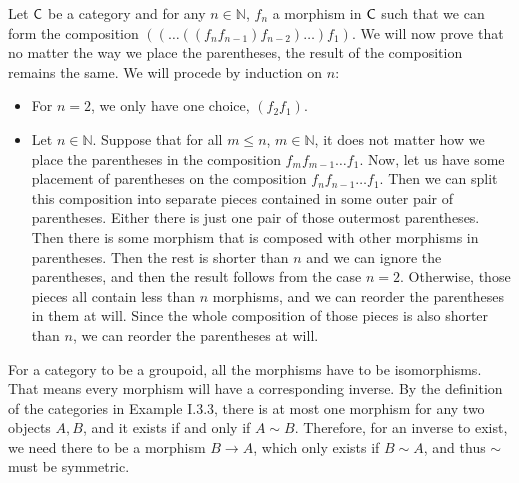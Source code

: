 \begin{solution}
	Let $\mathsf{C}$ be a category and for any $n \in \mathbb{N}$, $f_n$ a morphism in $\mathsf{C}$ such that we can form the composition $((\dots((f_{n}f_{n-1})f_{n-2})\dots)f_1)$. We will now prove that no matter the way we place the parentheses, the result of the composition remains the same. We will procede by induction on $n$:
	\begin{itemize}
		\item For $n=2$, we only have one choice, $(f_2f_1)$.
		\item Let $n \in \mathbb{N}$. Suppose that for all $m \leq n$, $m \in \mathbb{N}$, it does not matter how we place the parentheses in the composition $f_mf_{m-1}\dots f_1$. Now, let us have some placement of parentheses on the composition $f_nf_{n-1}\dots f_1$. Then we can split this composition into separate pieces contained in some outer pair of parentheses. Either there is just one pair of those outermost parentheses. Then there is some morphism that is composed with other morphisms in parentheses. Then the rest is shorter than $n$ and we can ignore the parentheses, and then the result follows from the case $n=2$. Otherwise, those pieces all contain less than $n$ morphisms, and we can reorder the parentheses in them at will. Since the whole composition of those pieces is also shorter than $n$, we can reorder the parentheses at will.
	\end{itemize}
\end{solution}

\begin{problem}
\end{problem}

\begin{solution}
	For a category to be a groupoid, all the morphisms have to be isomorphisms. That means every morphism will have a corresponding inverse. By the definition of the categories in Example I.3.3, there is at most one morphism for any two objects $A, B$, and it exists if and only if $A \sim B$. Therefore, for an inverse to exist, we need there to be a morphism $B \to A$, which only exists if $B \sim A$, and thus $\sim$ must be symmetric.
\end{solution}

\begin{problem}
\end{problem}

